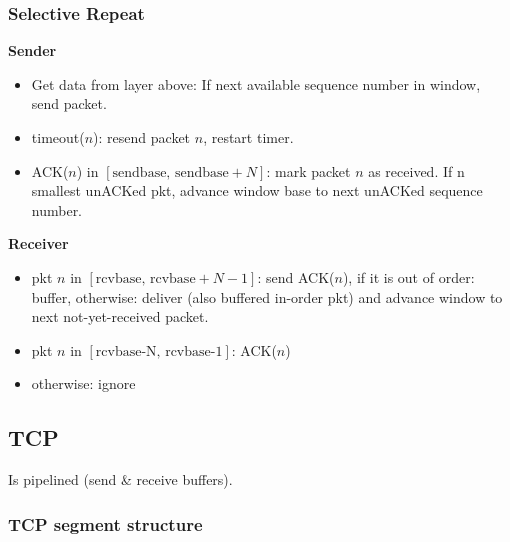 \documentclass[10pt, a4paper, twocolumn]{scrartcl}
\begin{document}
\subsubsection{Selective Repeat}

\textbf{Sender}
\begin{itemize}
	\item Get data from layer above: If next available sequence number in window, send packet.
	\item timeout($n$): resend packet $n$, restart timer.
	\item ACK($n$) in $[\mbox{sendbase, sendbase}+N]$: mark packet $n$ as received. If n smallest unACKed pkt, advance window base to next unACKed sequence number.
\end{itemize}

\textbf{Receiver}
\begin{itemize}
	\item pkt $n$ in $[\mbox{rcvbase, rcvbase}+N-1]$: send ACK($n$), if it is out of order: buffer, otherwise: deliver (also buffered in-order pkt) and advance window to next not-yet-received packet.
	\item pkt $n$ in $[\mbox{rcvbase-N, rcvbase-1}]$: ACK($n$)
	\item otherwise: ignore
\end{itemize}

\subsection{TCP}

Is pipelined (send \& receive buffers).

\subsubsection{TCP segment structure}

\end{document}
